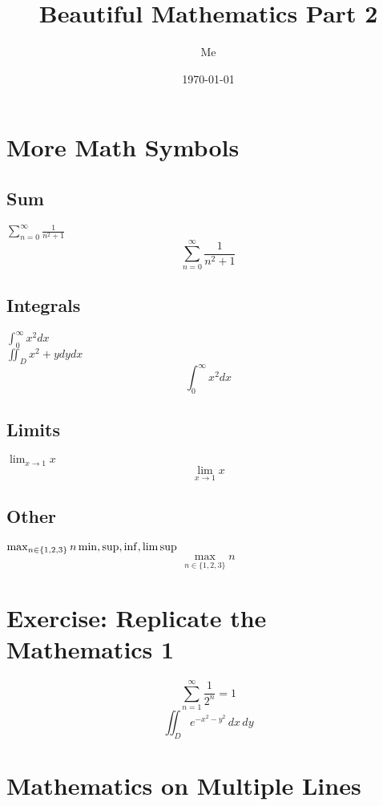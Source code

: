 \documentclass[12pt,titlepage]{article}
\title{Beautiful Mathematics Part 2}
\author{Me}
\date{\today}
\begin{document}
\maketitle
\newpage
\tableofcontents
\newpage

\section{More Math Symbols}
\subsection{Sum}
$\sum_{n=0}^{\infty}\frac{1}{n^{2}+1}$
\[\sum_{n=0}^{\infty}\frac{1}{n^{2}+1}\]

\subsection{Integrals}
$\int_{0}^{\infty}x^{2}dx$\\
$\iint_{D}^{}x^{2}+ydydx$
\[\int_{0}^{\infty}x^{2}dx\]

\subsection{Limits}
$\lim_{x \to 1}x$
\[\lim_{x \to 1}x\]

\subsection{Other}
$\max_{n \in \{1, 2, 3\}}n \\ \min, \sup, \inf, \limsup$
\[\max_{n \in \{1, 2, 3\}}n\]

\section{Exercise: Replicate the Mathematics 1}
\[\sum_{n=1}^{\infty}\frac{1}{2^{n}}=1\]
\[\iint_{D}e^{-x^{2}-y^{2}}\,dx\,dy\]

\newpage
\section{Mathematics on Multiple Lines}
\end{document}

